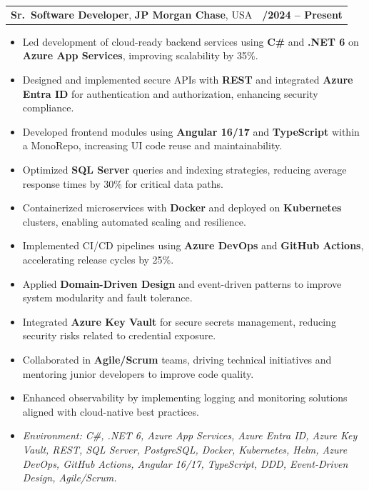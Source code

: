 \documentclass[letterpaper,11pt]{article}
\makeatletter
\newcommand{\resumeItem}[1]{
  \item\footnotesize{
    {#1 \vspace{-2pt}}
  }
}
\newcommand{\resumeSubheading}[4]{
  \vspace{-2pt}\item
    \begin{tabular*}{1.0\textwidth}[t]{l@{\extracolsep{\fill}}r}
      \textbf{\fontsize{10pt}{14pt}\selectfont #3}, \textbf{\fontsize{10pt}{14pt}\selectfont #1}, \fontsize{10pt}{14pt}\selectfont #4 & \textbf{\fontsize{10pt}{14pt}\selectfont #2} \\
    \end{tabular*}\vspace{-7pt}
}
\newcommand{\resumeItemListStart}{\begin{itemize}[leftmargin=*]}
\newcommand{\resumeItemListEnd}{\end{itemize}\vspace{-5pt}}
\makeatother
\begin{document}
\resumeSubheading
{JP Morgan Chase}{09/2024 -- Present}
{Sr.\ Software Developer}{USA}
\resumeItemListStart
  \resumeItem{Led development of cloud-ready backend services using \textbf{C\#} and \textbf{.NET 6} on \textbf{Azure App Services}, improving scalability by 35\%.}
  \resumeItem{Designed and implemented secure APIs with \textbf{REST} and integrated \textbf{Azure Entra ID} for authentication and authorization, enhancing security compliance.}
  \resumeItem{Developed frontend modules using \textbf{Angular 16/17} and \textbf{TypeScript} within a MonoRepo, increasing UI code reuse and maintainability.}
  \resumeItem{Optimized \textbf{SQL Server} queries and indexing strategies, reducing average response times by 30\% for critical data paths.}
  \resumeItem{Containerized microservices with \textbf{Docker} and deployed on \textbf{Kubernetes} clusters, enabling automated scaling and resilience.}
  \resumeItem{Implemented CI/CD pipelines using \textbf{Azure DevOps} and \textbf{GitHub Actions}, accelerating release cycles by 25\%.}
  \resumeItem{Applied \textbf{Domain-Driven Design} and event-driven patterns to improve system modularity and fault tolerance.}
  \resumeItem{Integrated \textbf{Azure Key Vault} for secure secrets management, reducing security risks related to credential exposure.}
  \resumeItem{Collaborated in \textbf{Agile/Scrum} teams, driving technical initiatives and mentoring junior developers to improve code quality.}
  \resumeItem{Enhanced observability by implementing logging and monitoring solutions aligned with cloud-native best practices.}
  \resumeItem{\textit{Environment: C\#, .NET 6, Azure App Services, Azure Entra ID, Azure Key Vault, REST, SQL Server, PostgreSQL, Docker, Kubernetes, Helm, Azure DevOps, GitHub Actions, Angular 16/17, TypeScript, DDD, Event-Driven Design, Agile/Scrum.}}
\resumeItemListEnd
\end{document}
